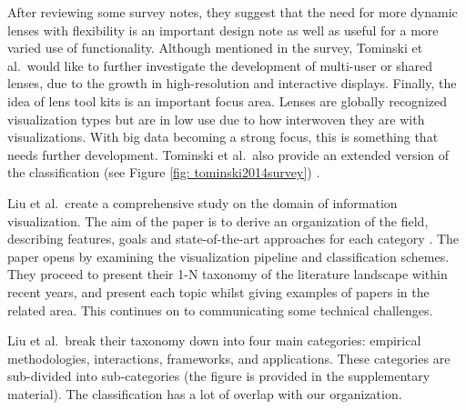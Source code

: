 After reviewing some survey notes, they suggest that the need for more dynamic lenses with flexibility is an important design note as well as useful for a more varied use of functionality. Although mentioned in the survey, Tominski et al.\ would like to further investigate the development of multi-user or shared lenses, due to the growth in high-resolution and interactive displays. Finally, the idea of lens tool kits is an important focus area. Lenses are globally recognized visualization types but are in low use due to how interwoven they are with visualizations. With big data becoming a strong focus, this is something that needs further development. Tominski et al.\ also provide an extended version of the classification (see Figure \ref{fig: tominski2014survey}) \cite{tominski2016interactive}.

Liu et al.\ create a comprehensive study on the domain of information visualization. The aim of the paper is to derive an organization of the field, describing features, goals and state-of-the-art approaches for each category \cite{liu2014survey}.
The paper opens by examining the visualization pipeline and classification schemes. They proceed to present their 1-N taxonomy of the literature landscape within recent years, and present each topic whilst giving examples of papers in the related area. This continues on to communicating some technical challenges.

Liu et al.\ break their taxonomy down into four main categories: empirical methodologies, interactions, frameworks, and applications. These categories are sub-divided into sub-categories (the figure is provided in the supplementary material). The classification has a lot of overlap with our organization. 



